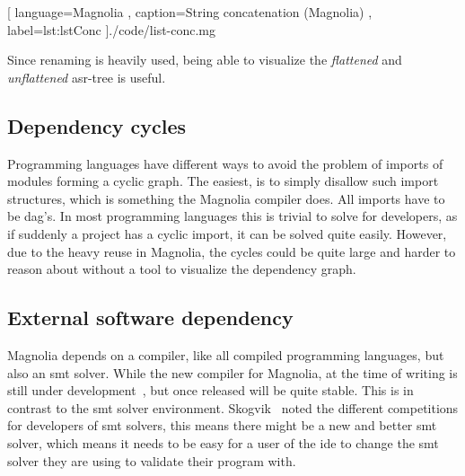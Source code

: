 \begin{center}
  
    [ language=Magnolia
    , caption={String concatenation (Magnolia)}
    , label=lst:lstConc
    ]{./code/list-conc.mg}
\end{center}

Since renaming is heavily used, being able to visualize the \textit{flattened}
and \textit{unflattened} \gls*{asr}-tree is useful.

\subsection{Dependency cycles}

Programming languages have different ways to avoid the problem of imports of
modules forming a cyclic graph. The easiest, is to simply disallow such import
structures, which is something the Magnolia compiler does. All imports have to be
\gls*{dag}'s. In most programming languages this is trivial to solve for
developers, as if suddenly a project has a cyclic import, it can be solved quite
easily. However, due to the heavy reuse in Magnolia, the cycles could be quite
large and harder to reason about without a tool to visualize the dependency graph.

\subsection{External software dependency}

Magnolia depends on a compiler, like all compiled programming languages, but
also an \gls*{smt} solver. While the new compiler for Magnolia, at the time of
writing is still under development~\cite{wiig}, but once released will be quite
stable. This is in contrast to the \gls*{smt} solver environment. Skogvik~\cite{beateVerification}
noted the different competitions for developers of \gls*{smt} solvers, this means
there might be a new and better \gls*{smt} solver, which means it needs to be
easy for a user of the \gls*{ide} to change the \gls*{smt} solver they are using
to validate their program with.
